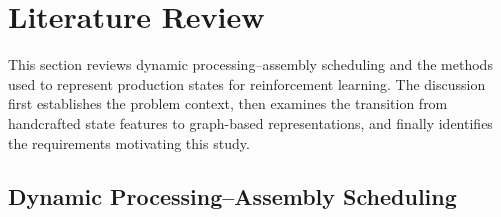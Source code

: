 \section{Literature Review}
\label{sec:literature}

This section reviews dynamic processing--assembly scheduling and the methods used to represent production
states for reinforcement learning. The discussion first establishes the problem context,
then examines the transition from handcrafted state features to graph-based representations,
and finally identifies the requirements motivating this study.


\subsection{Dynamic Processing--Assembly Scheduling}
\label{subsec:traditional_methods}

